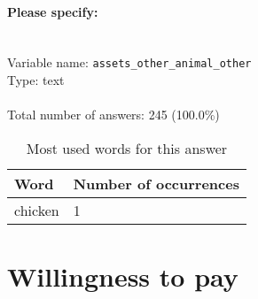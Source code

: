 \documentclass[11.5pt, a4paper]{scrartcl}
\begin{document}
\paragraph{Please specify:}
\  \\Variable name: \texttt{assets\_other\_animal\_other}\\
Type: text\\
\\Total number of answers: 245 (100.0\%)
\\[0.2em]\begin{table}[H]
 \begin{tabular}{p{4cm}|p{8cm}}
Word & Number of occurrences  \\
\hline
\cellcolor{mygray}chicken&\cellcolor{mygray}1\\
\hline
\end{tabular}
\caption{\label{tab:table-name} Most used words for this answer}
\end{table}
\newpage\section{Willingness to pay}
\end{document}
